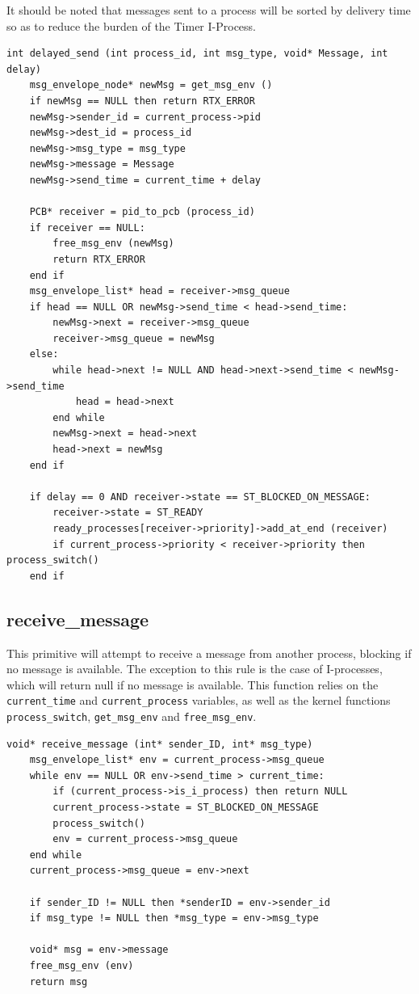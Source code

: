\documentclass[titlepage]{article}
\begin{document}
It should be noted that messages sent to a process will be sorted by delivery
time so as to reduce the burden of the Timer I-Process.

\begin{verbatim}
int delayed_send (int process_id, int msg_type, void* Message, int delay)
    msg_envelope_node* newMsg = get_msg_env ()
    if newMsg == NULL then return RTX_ERROR
    newMsg->sender_id = current_process->pid
    newMsg->dest_id = process_id
    newMsg->msg_type = msg_type
    newMsg->message = Message
    newMsg->send_time = current_time + delay

    PCB* receiver = pid_to_pcb (process_id)
    if receiver == NULL:
        free_msg_env (newMsg)
        return RTX_ERROR
    end if
    msg_envelope_list* head = receiver->msg_queue
    if head == NULL OR newMsg->send_time < head->send_time:
        newMsg->next = receiver->msg_queue
        receiver->msg_queue = newMsg
    else:
        while head->next != NULL AND head->next->send_time < newMsg->send_time
            head = head->next
        end while
        newMsg->next = head->next
        head->next = newMsg
    end if

    if delay == 0 AND receiver->state == ST_BLOCKED_ON_MESSAGE:
        receiver->state = ST_READY
        ready_processes[receiver->priority]->add_at_end (receiver)
        if current_process->priority < receiver->priority then process_switch()
    end if
\end{verbatim}

\subsection{receive\_message}

This primitive will attempt to receive a message from another process, blocking
if no message is available.  The exception to this rule is the case of
I-processes, which will return null if no message is available.  This function
relies on the \verb!current_time! and \verb!current_process! variables, as well
as the kernel functions \verb!process_switch!, \verb!get_msg_env! and
\verb!free_msg_env!.

\begin{verbatim}
void* receive_message (int* sender_ID, int* msg_type)
    msg_envelope_list* env = current_process->msg_queue
    while env == NULL OR env->send_time > current_time:
        if (current_process->is_i_process) then return NULL
        current_process->state = ST_BLOCKED_ON_MESSAGE
        process_switch()
        env = current_process->msg_queue
    end while
    current_process->msg_queue = env->next

    if sender_ID != NULL then *senderID = env->sender_id
    if msg_type != NULL then *msg_type = env->msg_type

    void* msg = env->message
    free_msg_env (env)
    return msg
\end{verbatim}
\end{document}
